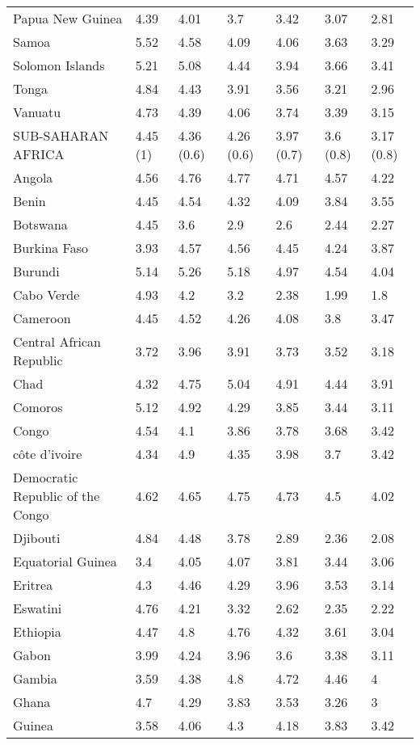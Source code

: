\begin{longtable}[t]{lllllll}
Papua New Guinea & 4.39 & 4.01 & 3.7 & 3.42 & 3.07 & 2.81\\
Samoa & 5.52 & 4.58 & 4.09 & 4.06 & 3.63 & 3.29\\
Solomon Islands & 5.21 & 5.08 & 4.44 & 3.94 & 3.66 & 3.41\\
Tonga & 4.84 & 4.43 & 3.91 & 3.56 & 3.21 & 2.96\\
Vanuatu & 4.73 & 4.39 & 4.06 & 3.74 & 3.39 & 3.15\\
SUB-SAHARAN AFRICA & 4.45 (1) & 4.36 (0.6) & 4.26 (0.6) & 3.97 (0.7) & 3.6 (0.8) & 3.17 (0.8)\\
Angola & 4.56 & 4.76 & 4.77 & 4.71 & 4.57 & 4.22\\
Benin & 4.45 & 4.54 & 4.32 & 4.09 & 3.84 & 3.55\\
Botswana & 4.45 & 3.6 & 2.9 & 2.6 & 2.44 & 2.27\\
Burkina Faso & 3.93 & 4.57 & 4.56 & 4.45 & 4.24 & 3.87\\
Burundi & 5.14 & 5.26 & 5.18 & 4.97 & 4.54 & 4.04\\
Cabo Verde & 4.93 & 4.2 & 3.2 & 2.38 & 1.99 & 1.8\\
Cameroon & 4.45 & 4.52 & 4.26 & 4.08 & 3.8 & 3.47\\
Central African Republic & 3.72 & 3.96 & 3.91 & 3.73 & 3.52 & 3.18\\
Chad & 4.32 & 4.75 & 5.04 & 4.91 & 4.44 & 3.91\\
Comoros & 5.12 & 4.92 & 4.29 & 3.85 & 3.44 & 3.11\\
Congo & 4.54 & 4.1 & 3.86 & 3.78 & 3.68 & 3.42\\
côte d'ivoire & 4.34 & 4.9 & 4.35 & 3.98 & 3.7 & 3.42\\
Democratic Republic of the Congo & 4.62 & 4.65 & 4.75 & 4.73 & 4.5 & 4.02\\
Djibouti & 4.84 & 4.48 & 3.78 & 2.89 & 2.36 & 2.08\\
Equatorial Guinea & 3.4 & 4.05 & 4.07 & 3.81 & 3.44 & 3.06\\
Eritrea & 4.3 & 4.46 & 4.29 & 3.96 & 3.53 & 3.14\\
Eswatini & 4.76 & 4.21 & 3.32 & 2.62 & 2.35 & 2.22\\
Ethiopia & 4.47 & 4.8 & 4.76 & 4.32 & 3.61 & 3.04\\
Gabon & 3.99 & 4.24 & 3.96 & 3.6 & 3.38 & 3.11\\
Gambia & 3.59 & 4.38 & 4.8 & 4.72 & 4.46 & 4\\
Ghana & 4.7 & 4.29 & 3.83 & 3.53 & 3.26 & 3\\
Guinea & 3.58 & 4.06 & 4.3 & 4.18 & 3.83 & 3.42\\

\end{longtable}
